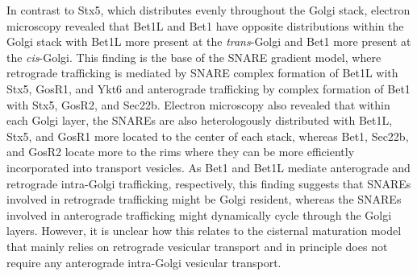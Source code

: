 In contrast to Stx5, which distributes evenly throughout the Golgi stack, electron microscopy revealed that Bet1L and Bet1 have opposite distributions within the Golgi stack with Bet1L more present at the \emph{trans}-Golgi and Bet1 more present at the \emph{cis}-Golgi\cite{volchuk_countercurrent_2004}. This finding is the base of the SNARE gradient model, where retrograde trafficking is mediated by SNARE complex formation of Bet1L with Stx5, GosR1, and Ykt6 and anterograde trafficking by complex formation of Bet1 with Stx5, GosR2, and Sec22b\cite{puthenveedu_subcompartmentalizing_2005,malsam_organization_2011,volchuk_countercurrent_2004}. Electron microscopy also revealed that within each Golgi layer, the SNAREs are also heterologously distributed with Bet1L, Stx5, and GosR1 more located to the center of each stack, whereas Bet1, Sec22b, and GosR2 locate more to the rims where they can be more efficiently incorporated into transport vesicles\cite{cosson_dynamic_2005}. As Bet1 and Bet1L mediate anterograde and retrograde intra-Golgi trafficking, respectively\cite{malsam_organization_2011,zhang_mammalian_1997,xu_gs15_2002,volchuk_countercurrent_2004,tai_participation_2004}, this finding suggests that SNAREs involved in retrograde trafficking might be Golgi resident, whereas the SNAREs involved in anterograde trafficking might dynamically cycle through the Golgi layers. However, it is unclear how this relates to the cisternal maturation model that mainly relies on retrograde vesicular transport and in principle does not require any anterograde intra-Golgi vesicular transport\cite{cottam_retrograde_2012}.

